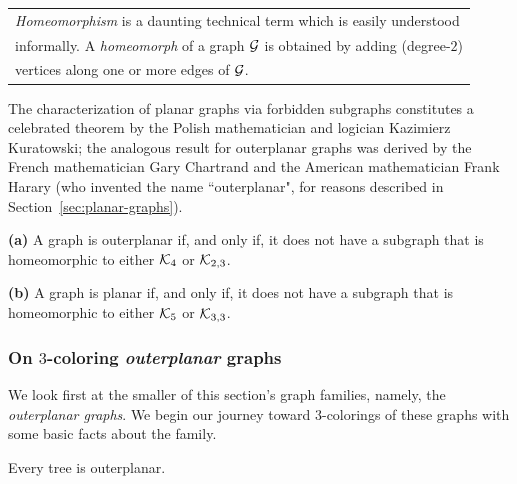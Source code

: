 \smallskip

\begin{tabular}{l}
{\it Homeomorphism} is a daunting technical term which is easily understood \\
informally.  A {\it homeomorph} of a graph $\mbox{$\cal G$}$ is obtained by adding (degree-$2$) \\
vertices along one or more edges of $\mbox{$\cal G$}$.
\end{tabular}

\smallskip


\noindent
The characterization of planar graphs via forbidden subgraphs constitutes a celebrated theorem by the Polish mathematician and logician Kazimierz Kuratowski; the analogous result for outerplanar graphs was derived by the French mathematician Gary Chartrand and the American mathematician Frank Harary (who invented the name ``outerplanar", for reasons described in Section~\ref{sec:planar-graphs}).

 
 
\begin{theorem}
\label{thm:planar+outerplanar-exclusion}
{\bf (a)} {\rm \cite{ChartrandB67}}
A graph is outerplanar if, and only if, it does not have a subgraph that is homeomorphic to either $\mbox{$\cal K$}_4$ or $\mbox{$\cal K$}_{2,3}$.

\smallskip

\noindent
{\bf (b)} {\rm \cite{Kuratowski30}}
A graph is planar if, and only if, it does not have a subgraph that is homeomorphic to either $\mbox{$\cal K$}_5$ or $\mbox{$\cal K$}_{3,3}$.
\end{theorem}


\subsubsection{On $3$-coloring {\em outerplanar} graphs}


We look first at the smaller of this section's graph families, namely, the {\it outerplanar graphs}. 
We begin our journey toward $3$-colorings of these graphs with some basic facts about the family.

\begin{prop}
\label{thm:trees-outerplanar}
Every tree is outerplanar.
\end{prop}

